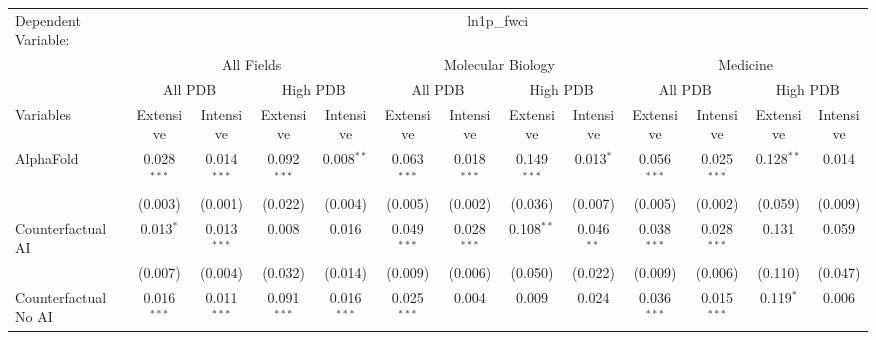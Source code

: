 \begingroup
\centering
\begin{tabular}{lcccccccccccc}
   \tabularnewline \midrule \midrule
   Dependent Variable: & \multicolumn{12}{c}{ln1p\_fwci}\\
 & \multicolumn{4}{c}{All Fields} & \multicolumn{4}{c}{Molecular Biology} & \multicolumn{4}{c}{Medicine} \\
\cmidrule(lr){2-5} \cmidrule(lr){6-9} \cmidrule(lr){10-13}
 & \multicolumn{2}{c}{All PDB} & \multicolumn{2}{c}{High PDB} & \multicolumn{2}{c}{All PDB} & \multicolumn{2}{c}{High PDB} & \multicolumn{2}{c}{All PDB} & \multicolumn{2}{c}{High PDB} \\
\cmidrule(lr){2-3} \cmidrule(lr){4-5} \cmidrule(lr){6-7} \cmidrule(lr){8-9} \cmidrule(lr){10-11} \cmidrule(lr){12-13}
Variables & \multicolumn{1}{c}{Extensive} & \multicolumn{1}{c}{Intensive} & \multicolumn{1}{c}{Extensive} & \multicolumn{1}{c}{Intensive} & \multicolumn{1}{c}{Extensive} & \multicolumn{1}{c}{Intensive} & \multicolumn{1}{c}{Extensive} & \multicolumn{1}{c}{Intensive} & \multicolumn{1}{c}{Extensive} & \multicolumn{1}{c}{Intensive} & \multicolumn{1}{c}{Extensive} & \multicolumn{1}{c}{Intensive} \\
\cmidrule(lr){1-1}\cmidrule(lr){2-2} \cmidrule(lr){3-3} \cmidrule(lr){4-4} \cmidrule(lr){5-5} \cmidrule(lr){6-6} \cmidrule(lr){7-7} \cmidrule(lr){8-8} \cmidrule(lr){9-9} \cmidrule(lr){10-10} \cmidrule(lr){11-11} \cmidrule(lr){12-12} \cmidrule(lr){13-13}
   AlphaFold                                & 0.028$^{***}$ & 0.014$^{***}$   & 0.092$^{***}$ & 0.008$^{**}$    & 0.063$^{***}$ & 0.018$^{***}$  & 0.149$^{***}$ & 0.013$^{*}$    & 0.056$^{***}$ & 0.025$^{***}$   & 0.128$^{**}$ & 0.014\\   
                                            & (0.003)       & (0.001)         & (0.022)       & (0.004)         & (0.005)       & (0.002)        & (0.036)       & (0.007)        & (0.005)       & (0.002)         & (0.059)      & (0.009)\\   
   Counterfactual AI                        & 0.013$^{*}$   & 0.013$^{***}$   & 0.008         & 0.016           & 0.049$^{***}$ & 0.028$^{***}$  & 0.108$^{**}$  & 0.046$^{**}$   & 0.038$^{***}$ & 0.028$^{***}$   & 0.131        & 0.059\\   
                                            & (0.007)       & (0.004)         & (0.032)       & (0.014)         & (0.009)       & (0.006)        & (0.050)       & (0.022)        & (0.009)       & (0.006)         & (0.110)      & (0.047)\\   
   Counterfactual No AI                     & 0.016$^{***}$ & 0.011$^{***}$   & 0.091$^{***}$ & 0.016$^{***}$   & 0.025$^{***}$ & 0.004          & 0.009         & 0.024          & 0.036$^{***}$ & 0.015$^{***}$   & 0.119$^{*}$  & 0.006\\   

\end{tabular}
